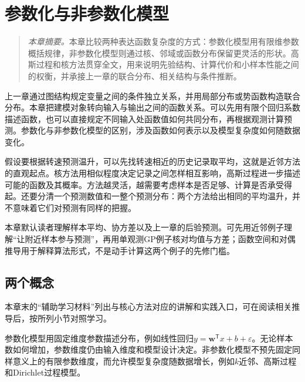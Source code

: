 \chapter{参数化与非参数化模型}
\begin{quote}\small
\textit{本章摘要。}本章比较两种表达函数复杂度的方式：参数化模型用有限维参数概括规律，非参数化模型则通过核、邻域或函数分布保留更灵活的形状。高斯过程和核方法贯穿全文，用来说明先验结构、计算代价和小样本性能之间的权衡，并承接上一章的联合分布、相关结构与条件推断。
\end{quote}
上一章通过图结构规定变量之间的条件独立关系，并用局部分布或势函数构造联合分布。本章把建模对象转向输入与输出之间的函数关系。可以先用有限个回归系数描述函数，也可以直接规定不同输入处函数值如何共同分布，再根据观测计算预测。参数化与非参数化模型的区别，涉及函数如何表示以及模型复杂度如何随数据变化。

假设要根据转速预测温升，可以先找转速相近的历史记录取平均，这就是近邻方法的直观起点。核方法用相似程度决定记录之间怎样相互影响，高斯过程进一步描述可能的函数及其概率。方法越灵活，越需要考虑样本是否足够、计算是否承受得起。还要分清一个预测数值和一整个预测分布：两个方法给出相同的平均温升，并不意味着它们对预测有同样的把握。

本章默认读者理解样本平均、协方差以及上一章的后验预测。可先用近邻例子理解“让附近样本参与预测”，再用单观测GP例子核对均值与方差；函数空间和对偶推导用于解释算法形式，不是动手计算这两个例子的先修门槛。

\section{两个概念}

本章末的“辅助学习材料”列出与核心方法对应的讲解和实践入口，可在阅读相关推导后，按所列小节对照学习。

参数化模型用固定维度参数描述分布，例如线性回归$y=\bm{w}^{\mathsf T}x+b+\varepsilon$。无论样本数如何增加，参数维度仍由输入维度和模型设计决定。非参数化模型不预先固定同样意义上的有限参数维度，而允许模型复杂度随数据增长，例如$k$近邻、高斯过程和Dirichlet过程模型。


